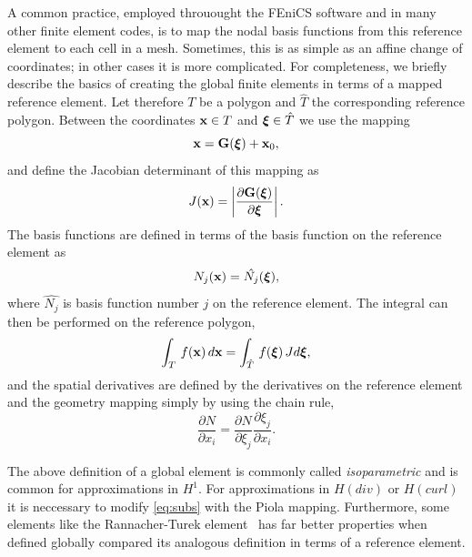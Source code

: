A common practice, employed throuought the FEniCS
software and in many other finite element codes, is to map the nodal
basis functions from this reference element to each cell in a mesh.
Sometimes, this is as simple as an affine change of coordinates; in
other cases it is more complicated.
For completeness, we briefly describe the basics of creating the global finite elements in terms of a mapped
reference element. Let therefore $T$ be a polygon and $\hat{T}$ the corresponding reference polygon.
Between the coordinates
$\mathbf{x}\in T$ and ${\mbox{\boldmath $\xi$}}\in\hat T$ we use the mapping 
\begin{equation}
\label{eq:geometry}
\mathbf{x} = \mathbf{G}({\mbox{\boldmath $\xi$}}) + \mathbf{x}_0,
\end{equation}
and define the Jacobian determinant of this mapping as
\begin{equation}
\label{eq:geometry2}
J(\mathbf{x}) = \left| \frac{\partial\mathbf{G}({\mbox{\boldmath $\xi$}}) }{\partial {\mbox{\boldmath $\xi$}}} \right| .
\end{equation}
The basis functions are defined in terms of the basis function
on the reference element as
\begin{equation}
\label{eq:subs}
N_j(\mathbf{x}) = \hat{N_j}({\mbox{\boldmath $\xi$}}), 
\end{equation}
where $\hat{N_j}$ is basis function number $j$ on the reference element. 
The integral can then be performed on the reference polygon, 
\begin{equation}
\label{eq:integration2}
\int_T \, f(\mathbf{x}) \, d\mathbf{x} = \int_{\hat{T}} \, f({\mbox{\boldmath $\xi$}}) \, J d{\mbox{\boldmath $\xi$}} ,
\end{equation}
and the spatial derivatives are defined by the derivatives on the
reference element and the geometry mapping simply by using the
chain rule, 
\begin{equation}
\label{eq:chain}
\frac{\partial N}{\partial x_i} = 
\frac{\partial N}{\partial \xi_j} \frac{\partial \xi_j }{\partial x_i }  .
\end{equation}

The above definition of a global element is commonly called \emph{isoparametric}
and is common for approximations in $H^1$. For approximations in $H(div)$ or
$H(curl)$ it is neccessary to modify \eqref{eq:subs} with the Piola mapping.  
Furthermore, some elements like the Rannacher-Turek element~\cite{Turek99,RannacherTurek92} has far better
properties when defined globally compared its analogous definition in terms
of a reference element. 


